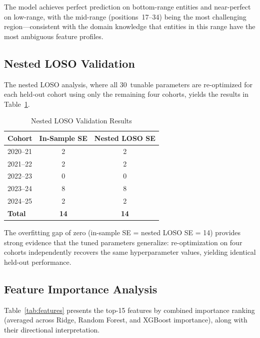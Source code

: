 \documentclass[conference]{IEEEtran}
\begin{document}
The model achieves perfect prediction on bottom-range entities and near-perfect on low-range, with the mid-range (positions~17--34) being the most challenging region---consistent with the domain knowledge that entities in this range have the most ambiguous feature profiles.

\subsection{Nested LOSO Validation}

The nested LOSO analysis, where all 30~tunable parameters are re-optimized for each held-out cohort using only the remaining four cohorts, yields the results in Table~\ref{tab:nested}.

\begin{table}[htbp]
\centering
\caption{Nested LOSO Validation Results}
\label{tab:nested}
\begin{tabular}{@{}lcc@{}}
\toprule
\textbf{Cohort} & \textbf{In-Sample SE} & \textbf{Nested LOSO SE} \\
\midrule
2020--21 & 2 & 2 \\
2021--22 & 2 & 2 \\
2022--23 & 0 & 0 \\
2023--24 & 8 & 8 \\
2024--25 & 2 & 2 \\
\midrule
\textbf{Total} & \textbf{14} & \textbf{14} \\
\bottomrule
\end{tabular}
\end{table}

The overfitting gap of zero (in-sample SE = nested LOSO SE = 14) provides strong evidence that the tuned parameters generalize: re-optimization on four cohorts independently recovers the same hyperparameter values, yielding identical held-out performance.

\subsection{Feature Importance Analysis}

Table~\ref{tab:features} presents the top-15 features by combined importance ranking (averaged across Ridge, Random Forest, and XGBoost importance), along with their directional interpretation.
\end{document}
